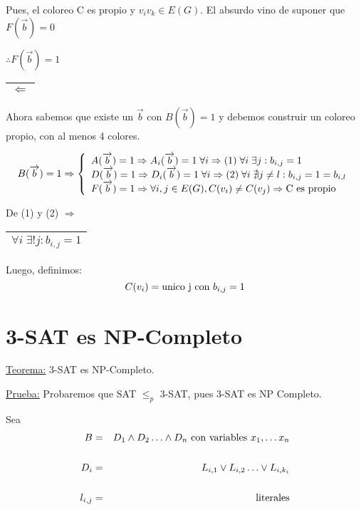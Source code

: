 \documentclass[12pt,a4paper]{report}
\newcounter{neq}
\begin{document}
		Pues, el coloreo C es propio y $v_{i} v_{k} \in E(G)$. El absurdo vino de suponer que $F(\overrightarrow{b}) = 0$

		\vspace{3mm}
		$\therefore F(\overrightarrow{b}) = 1$

		\vspace{5mm}
		\begin{tabular}{|c|} \hline $\Leftarrow$ \\ \hline \end{tabular}

		Ahora sabemos que existe un $\overrightarrow{b}$ con $B(\overrightarrow{b}) = 1$ y debemos construir un coloreo propio, con al menos 4 colores.

		\begin{equation*}
			B(\overrightarrow{b}) = 1\Rightarrow
  			\left \lbrace
  			\begin{array}{l}
    		 A(\overrightarrow{b}) = 1 \Rightarrow A_{i}(\overrightarrow{b}) = 1 \; \forall i \Rightarrow  (1) \; \forall i \; \exists j : b_{i, j}  = 1 \\
     		 D(\overrightarrow{b}) = 1 \Rightarrow D_{i}(\overrightarrow{b}) = 1 \; \forall i \Rightarrow  (2) \;  \forall i \; \nexists j \neq l : b_{i, j}  = 1 = b_{i, l} \\
     		 F(\overrightarrow{b}) = 1 \Rightarrow \forall i, j \in E(G), C(v_{i}) \neq C(v_{j}) \Rightarrow \textup{C es propio}
  			\end{array}
  			\right.
		\end{equation*}

		De (1) y (2) $\Rightarrow$ \begin{tabular}{|c|} \hline $\forall i \; \exists ! j : b_{i, j} = 1$ \\ \hline \end{tabular}

		\vspace{3mm}
		Luego, definimos:
		\[ C(v_{i}) = \textup{unico j con } b_{i, j} = 1\]


	\section{3-SAT es NP-Completo}
		\underline{Teorema:} 3-SAT es NP-Completo.

		\vspace{3mm}
		\underline{Prueba:} Probaremos que SAT $\leq_{p}$ 3-SAT, pues 3-SAT es NP Completo.

		\vspace{3mm}
		Sea
		\begin{eqnarray}
			B &=& D_{1} \wedge D_{2} \dotsc \wedge D_{n} \textup{ con variables } x_{1}, \dotsc x_{n} \\
			\nonumber \\
			D_{i} &=& L_{i, 1} \vee L_{i, 2} \dotsc \vee L_{i, k_{i}} \\
			\nonumber \\
			l_{i, j} &=& \textup{literales}
		\end{eqnarray}
\end{document}
